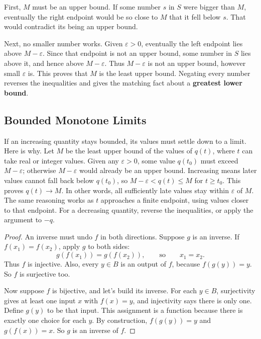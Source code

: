 First, $M$ must be an upper bound. If some number $s$ in $S$ were bigger
than $M$, eventually the right endpoint would be so close to $M$ that it
fell below $s$. That would contradict its being an upper bound.

Next, no smaller number works. Given $\varepsilon>0$, eventually the
left endpoint lies above $M-\varepsilon$. Since that endpoint is not an
upper bound, some number in $S$ lies above it, and hence above
$M-\varepsilon$. Thus $M-\varepsilon$ is not an upper bound, however small
$\varepsilon$ is. This proves that $M$ is the least upper bound.
Negating every number reverses the inequalities and gives the matching
fact about a \textbf{greatest lower bound}.

\subsection*{Bounded Monotone Limits}
\label{sec:bounded-monotone-limits}

If an increasing quantity stays bounded, its values must settle down to
a limit. Here is why. Let $M$ be the least upper bound of the values of
$q(t)$, where $t$ can take real or integer values. Given any
$\varepsilon>0$, some value $q(t_0)$ must exceed $M-\varepsilon$;
otherwise $M-\varepsilon$ would already be an upper bound. Increasing
means later values cannot fall back below $q(t_0)$, so
$M-\varepsilon<q(t)\leq M$ for $t\geq t_0$. This proves $q(t)\to M$.
In other words, all sufficiently late values stay within $\varepsilon$
of $M$. The same reasoning works as $t$ approaches a finite endpoint,
using values closer to that endpoint. For a decreasing quantity, reverse
the inequalities, or apply the argument to $-q$.



\begin{proof}
An inverse must undo $f$ in both directions. Suppose $g$ is an inverse.
If $f(x_1)=f(x_2)$, apply $g$ to both sides:
$$g(f(x_1))=g(f(x_2)),\qquad\text{so}\qquad x_1=x_2.$$
Thus $f$ is injective. Also, every $y\in B$ is an output of $f$, because
$f(g(y))=y$. So $f$ is surjective too.

Now suppose $f$ is bijective, and let's build its inverse.
For each $y\in B$, surjectivity gives at least one input $x$ with
$f(x)=y$, and injectivity says there is only one. Define $g(y)$ to be
that input. This assignment is a function because there is exactly one
choice for each $y$. By construction, $f(g(y))=y$ and $g(f(x))=x$.
So $g$ is an inverse of $f$.
\end{proof}


